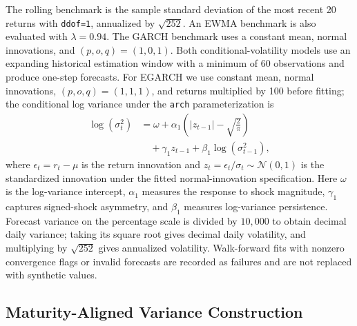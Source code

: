 \documentclass[journal]{IEEEtran}
\begin{document}
The rolling benchmark is the sample standard deviation of the most recent 20 returns with \texttt{ddof=1}, annualized by $\sqrt{252}$. An EWMA benchmark is also evaluated with $\lambda=0.94$. The GARCH benchmark uses a constant mean, normal innovations, and $(p,o,q)=(1,0,1)$. Both conditional-volatility models use an expanding historical estimation window with a minimum of 60 observations and produce one-step forecasts. For EGARCH we use constant mean, normal innovations, $(p,o,q)=(1,1,1)$, and returns multiplied by 100 before fitting; the conditional log variance under the \texttt{arch} parameterization is
\begin{equation}
\begin{split}
\log(\sigma_t^2) &= \omega+\alpha_1\left(\left|z_{t-1}\right|-\sqrt{\frac{2}{\pi}}\right)\\
&\quad +\gamma_1 z_{t-1}+\beta_1\log(\sigma_{t-1}^2),
\end{split}
\end{equation}
where $\epsilon_t = r_t-\mu$ is the return innovation and
$z_t = \epsilon_t/\sigma_t \sim \mathcal{N}(0,1)$ is the
standardized innovation under the fitted normal-innovation
specification.
Here $\omega$ is the log-variance intercept, $\alpha_1$ measures the response to shock magnitude, $\gamma_1$ captures signed-shock asymmetry, and $\beta_1$ measures log-variance persistence. Forecast variance on the percentage scale is divided by $10{,}000$ to obtain decimal daily variance; taking its square root gives decimal daily volatility, and multiplying by $\sqrt{252}$ gives annualized volatility. Walk-forward fits with nonzero convergence flags or invalid forecasts are recorded as failures and are not replaced with synthetic values.

\subsection{Maturity-Aligned Variance Construction}
\end{document}
